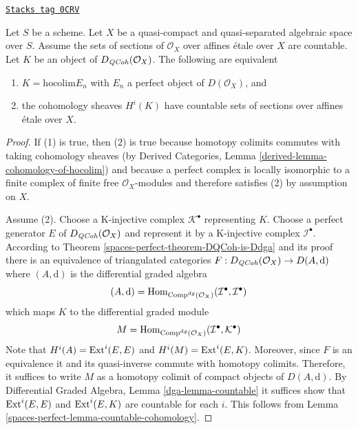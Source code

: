 \begin{lemma}[Countable]
\label{spaces-perfect-lemma-countable}
\href{https://stacks.math.columbia.edu/tag/0CRV}{\texttt{Stacks tag 0CRV}}

Let $S$ be a scheme.
Let $X$ be a quasi-compact and quasi-separated algebraic space over $S$.
Assume the sets of sections of $\mathcal{O}_X$ over affines \'etale over $X$
are countable. Let $K$ be an object of $D_{\mathit{QCoh}}(\mathcal{O}_X)$. The
following are equivalent
\begin{enumerate}
\item $K = \text{hocolim} E_n$ with $E_n$ a perfect object of
$D(\mathcal{O}_X)$, and
\item the cohomology sheaves $H^i(K)$ have countable
sets of sections over affines \'etale over $X$.
\end{enumerate}
\end{lemma}

\begin{proof}
If (1) is true, then (2) is true because homotopy colimits commutes
with taking cohomology sheaves
(by Derived Categories, Lemma \ref{derived-lemma-cohomology-of-hocolim})
and because a perfect complex is
locally isomorphic to a finite complex of finite free $\mathcal{O}_X$-modules
and therefore satisfies (2) by assumption on $X$.

\medskip\noindent
Assume (2).
Choose a K-injective complex $\mathcal{K}^\bullet$ representing $K$.
Choose a perfect generator $E$ of $D_{\mathit{QCoh}}(\mathcal{O}_X)$ and
represent it by a K-injective complex $\mathcal{I}^\bullet$.
According to Theorem \ref{spaces-perfect-theorem-DQCoh-is-Ddga}
and its proof there is an equivalence
of triangulated categories $F : D_{\mathit{QCoh}}(\mathcal{O}_X) \to D(A, \text{d})$
where $(A, \text{d})$ is the differential graded algebra
$$
(A, \text{d}) =
\operatorname{Hom}_{\text{Comp}^{dg}(\mathcal{O}_X)}
(\mathcal{I}^\bullet, \mathcal{I}^\bullet)
$$
which maps $K$ to the differential graded module
$$
M = \operatorname{Hom}_{\text{Comp}^{dg}(\mathcal{O}_X)}
(\mathcal{I}^\bullet, \mathcal{K}^\bullet)
$$
Note that $H^i(A) = \operatorname{Ext}^i(E, E)$ and
$H^i(M) = \operatorname{Ext}^i(E, K)$.
Moreover, since $F$ is an equivalence it and its quasi-inverse commute
with homotopy colimits.
Therefore, it suffices to write $M$ as a homotopy colimit
of compact objects of $D(A, \text{d})$.
By Differential Graded Algebra, Lemma \ref{dga-lemma-countable}
it suffices show that $\operatorname{Ext}^i(E, E)$ and
$\operatorname{Ext}^i(E, K)$ are countable for each $i$.
This follows from Lemma \ref{spaces-perfect-lemma-countable-cohomology}.
\end{proof}

